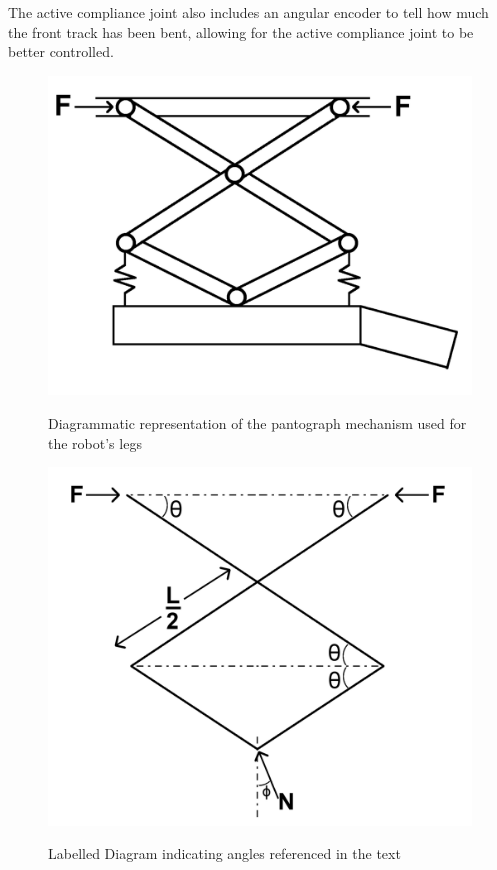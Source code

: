 \documentclass[11pt]{article}		%
\newlength{\imageheight}	 %
\begin{document}
			The active compliance joint also includes an angular encoder to tell how much the front track has been bent, allowing for the active compliance joint to be better controlled.
			\begin{figure}[h]
				\centering
				\begin{multicols}{2}
					\includegraphics[height=\imageheight]{legDesign}
					\caption{Diagrammatic representation of the pantograph mechanism used for the robot's legs}
					\label{legDesign}
					\columnbreak
					\includegraphics[height=\imageheight]{legDiagram}
					\caption{Labelled Diagram indicating angles referenced in the text}
					\label{legDiagram}
				\end{multicols}
			\end{figure}			
\end{document}
